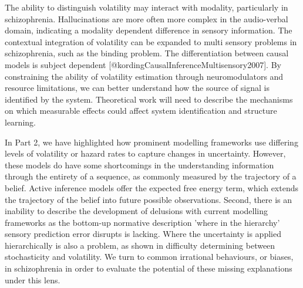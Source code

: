 \documentclass{article}
\begin{document}
The ability to distinguish volatility may interact with modality, particularly in schizophrenia. Hallucinations are more often more complex in the audio-verbal domain, indicating a modality dependent difference in sensory information. The contextual integration of volatility can be expanded to multi sensory problems in schizophrenia, such as the binding problem. The differentiation between causal models is subject dependent [@kordingCausalInferenceMultisensory2007]. By constraining the ability of volatility estimation through neuromodulators and resource limitations, we can better understand how the source of signal is identified by the system. Theoretical work will need to describe the mechanisms on which measurable effects could affect system identification and structure learning.

In Part 2, we have highlighted how prominent modelling frameworks use differing levels of volatility or hazard rates to capture changes in uncertainty. However, these models do have some shortcomings in the understanding information through the entirety of a sequence, as commonly measured by the trajectory of a belief. Active inference models offer the expected free energy term, which extends the trajectory of the belief into future possible observations. Second, there is an inability to describe the development of delusions with current modelling frameworks as the bottom-up normative description 'where in the hierarchy' sensory prediction error disrupts is lacking. Where the uncertainty is applied hierarchically is also a problem, as shown in difficulty determining between stochasticity and volatility. We turn to common irrational behaviours, or biases, in schizophrenia in order to evaluate the potential of these missing explanations under this lens.
\end{document}
